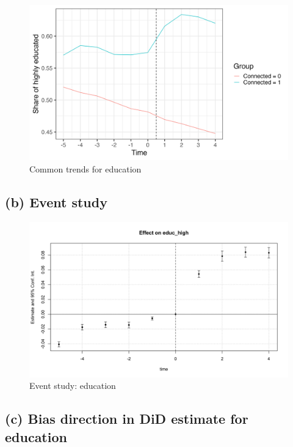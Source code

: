 \documentclass{scrartcl}
\begin{document}
\begin{figure}[h!]
    \centering
    \includegraphics[width=0.75\linewidth]{output/figures/2_common_trends.png}
    \caption{Common trends for education}
    \label{fig:commontrends}
\end{figure}


\subsection*{(b) Event study}

\begin{figure}[h!]
    \centering
    \includegraphics[width=0.75\linewidth]{output/figures/2_event_study.png}
    \caption{Event study: education}
    \label{fig:eventstudy}
\end{figure}


\subsection*{(c) Bias direction in DiD estimate for education}
\end{document}

